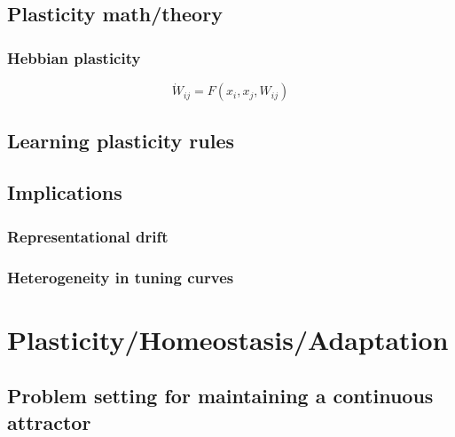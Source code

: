 \documentclass{article}
\theoremstyle{definition} \newtheorem{definition}{Definition}
\theoremstyle{remark} \newtheorem{remark}{Remark}
\newcounter{ct}
\begin{document}
\subsection{Plasticity math/theory}
\citep{gerstner2002mathematical}
\citep{berner2023adaptive}
\citep{clark2024theory}
\citep{tyulmankov2024computational}


\subsubsection{Hebbian plasticity}
\begin{equation}
\dot W_{ij} = F(x_i, x_j, W_{ij})
\end{equation}



\subsection{Learning plasticity rules} %
\citep{shervani2023meta}
\citep{bell2024discovering}
\citep{jordan2021plasticity}

\citep{nayebi2020learning}
\citep{kepple2022curriculum}
\citep{mcmahan2021learning}
\citep{ashwood2020inferring}

\citep{tyulmankov2022meta}


\subsection{Implications}
\subsubsection{Representational drift}

\subsubsection{Heterogeneity in tuning curves}




\section{Plasticity/Homeostasis/Adaptation}
\citep{martin2000plasticity}
\citep{takeuchi2014plasticity}

\cite{bell2024discovering} \citep{shervani2023meta}



\subsection{Problem setting for maintaining a continuous attractor}
\end{document}
